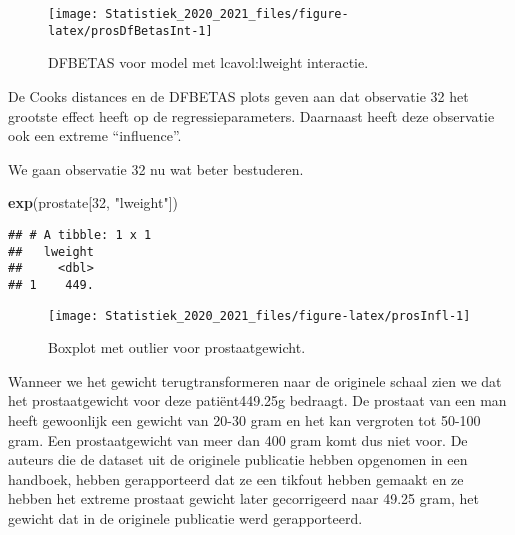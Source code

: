 \documentclass[
  12pt,dutch,coursenotes]{book}
\newenvironment{Shaded}{\begin{snugshade}}{\end{snugshade}}
\newcommand{\DataTypeTok}[1]{\textcolor[rgb]{0.13,0.29,0.53}{#1}}
\newcommand{\DecValTok}[1]{\textcolor[rgb]{0.00,0.00,0.81}{#1}}
\newcommand{\KeywordTok}[1]{\textcolor[rgb]{0.13,0.29,0.53}{\textbf{#1}}}
\newcommand{\NormalTok}[1]{#1}
\newcommand{\OperatorTok}[1]{\textcolor[rgb]{0.81,0.36,0.00}{\textbf{#1}}}
\newcommand{\StringTok}[1]{\textcolor[rgb]{0.31,0.60,0.02}{#1}}
\theoremstyle{definition}
\theoremstyle{definition}
\theoremstyle{definition}
\theoremstyle{remark}
\begin{document}
\begin{figure}

{\centering \texttt{[image: Statistiek\_2020\_2021\_files/figure-latex/prosDfBetasInt-1]} 

}

\caption{DFBETAS voor model met lcavol:lweight interactie.}\label{fig:prosDfBetasInt}
\end{figure}

De Cooks distances en de DFBETAS plots geven aan dat observatie 32 het grootste effect heeft op de regressieparameters. Daarnaast heeft deze observatie ook een extreme ``influence''.

We gaan observatie 32 nu wat beter bestuderen.

\begin{Shaded}
\begin{Highlighting}[]
\KeywordTok{exp}\NormalTok{(prostate[}\DecValTok{32}\NormalTok{, }\StringTok{"lweight"}\NormalTok{])}
\end{Highlighting}
\end{Shaded}

\begin{verbatim}
## # A tibble: 1 x 1
##   lweight
##     <dbl>
## 1    449.
\end{verbatim}

\begin{Shaded}
\end{Shaded}

\begin{figure}

{\centering \texttt{[image: Statistiek\_2020\_2021\_files/figure-latex/prosInfl-1]} 

}

\caption{Boxplot met outlier voor prostaatgewicht.}\label{fig:prosInfl}
\end{figure}

Wanneer we het gewicht terugtransformeren naar de originele schaal zien we dat het prostaatgewicht voor deze patiënt449.25g bedraagt. De prostaat van een man heeft gewoonlijk een gewicht van 20-30 gram en het kan vergroten tot 50-100 gram.
Een prostaatgewicht van meer dan 400 gram komt dus niet voor.
De auteurs die de dataset uit de originele publicatie hebben opgenomen in een handboek, hebben gerapporteerd dat ze een tikfout hebben gemaakt en ze hebben het extreme prostaat gewicht later gecorrigeerd naar 49.25 gram, het gewicht dat in de originele publicatie werd gerapporteerd.
\end{document}
